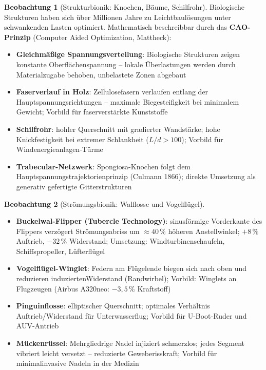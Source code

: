 ﻿\documentclass[a4paper,12pt]{report}
\theoremstyle{definition}
\newtheorem{beobachtung}{Beobachtung}
\begin{document}
\begin{beobachtung}[Strukturbionik: Knochen, Bäume, Schilfrohr]
Biologische Strukturen haben sich über Millionen Jahre zu Leichtbaulösungen
unter schwankenden Lasten optimiert. Mathematisch beschreibbar durch
das \textbf{CAO-Prinzip} (Computer Aided Optimization, Mattheck):
\begin{itemize}
    \item[-] \textbf{Gleichmäßige Spannungsverteilung}: Biologische Strukturen
          zeigen konstante Oberflächenspannung -- lokale Überlastungen werden
          durch Materialzugabe behoben, unbelastete Zonen abgebaut
    \item[-] \textbf{Faserverlauf in Holz}: Zellulosefasern verlaufen entlang
          der Hauptspannungsrichtungen -- maximale Biegesteifigkeit bei
          minimalem Gewicht; Vorbild für faserverstärkte Kunststoffe
    \item[-] \textbf{Schilfrohr}: hohler Querschnitt mit gradierter Wandstärke;
          hohe Knickfestigkeit bei extremer Schlankheit ($L/d > 100$);
          Vorbild für Windenergieanlagen-Türme
    \item[-] \textbf{Trabecular-Netzwerk}: Spongiosa-Knochen folgt dem
          Hauptspannungstrajektorienprinzip (Culmann 1866);
          direkte Umsetzung als generativ gefertigte Gitterstrukturen
\end{itemize}
\end{beobachtung}

\begin{beobachtung}[Strömungsbionik: Walflosse und Vogelflügel]
\begin{itemize}
    \item[-] \textbf{Buckelwal-Flipper (Tubercle Technology)}: sinusförmige
          Vorderkante des Flippers verzögert Strömungsabriss um $\approx 40\,\%$
          höheren Anstellwinkel; $+8\,\%$ Auftrieb, $-32\,\%$ Widerstand;
          Umsetzung: Windturbinenschaufeln, Schiffspropeller, Lüfterflügel
    \item[-] \textbf{Vogelflügel-Winglet}: Federn am Flügelende biegen sich
          nach oben und reduzieren induziertenWiderstand (Randwirbel);
          Vorbild: Winglets an Flugzeugen (Airbus A320neo: $-3{,}5\,\%$ Kraftstoff)
    \item[-] \textbf{Pinguinflosse}: elliptischer Querschnitt; optimales
          Verhältnis Auftrieb/Widerstand für Unterwasserflug;
          Vorbild für U-Boot-Ruder und AUV-Antrieb
    \item[-] \textbf{Mückenrüssel}: Mehrgliedrige Nadel injiziert schmerzlos;
          jedes Segment vibriert leicht versetzt -- reduzierte Geweberisskraft;
          Vorbild für minimalinvasive Nadeln in der Medizin
\end{itemize}
\end{beobachtung}
\end{document}
